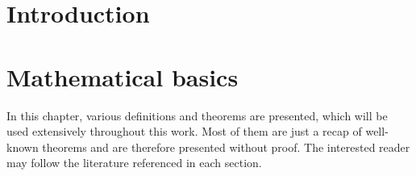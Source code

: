 \documentclass[12pt,a4paper,twoside, open=right]{scrreprt}
\theoremstyle{definition}
\theoremstyle{plain}
\begin{document}
\chapter{Introduction}
\lipsum[1]
\newpage
\chapter{Mathematical basics}
In this chapter, various definitions and theorems are presented, which will be used extensively throughout this work. Most of them are just a recap of well-known theorems and are therefore presented without proof. The interested reader may follow the literature referenced in each section.
\end{document}
